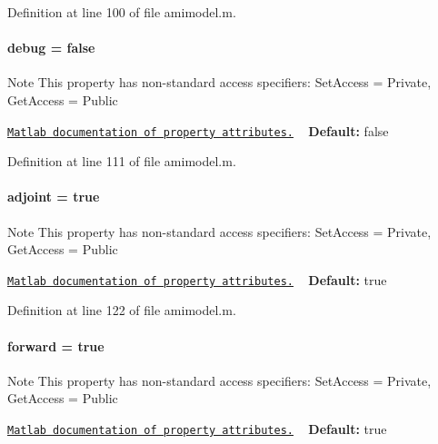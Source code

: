 Definition at line 100 of file amimodel.\+m.

\hypertarget{classamimodel_a0514aabed091ee5e2f35766eb01eced6}{}
\paragraph[{debug}]{\setlength{\rightskip}{0pt plus 5cm}debug = false}\label{classamimodel_a0514aabed091ee5e2f35766eb01eced6}
\begin{DoxyNote}{Note}
This property has non-\/standard access specifiers\+: {\ttfamily Set\+Access = Private, Get\+Access = Public} 

\href{http://www.mathworks.com/help/matlab/matlab_oop/property-attributes.html}{\tt Matlab documentation of property attributes.} ~\newline
{\bfseries Default\+:} false 
\end{DoxyNote}


Definition at line 111 of file amimodel.\+m.

\hypertarget{classamimodel_ab6d500b41cf50693452415caca31d32e}{}
\paragraph[{adjoint}]{\setlength{\rightskip}{0pt plus 5cm}adjoint = true}\label{classamimodel_ab6d500b41cf50693452415caca31d32e}
\begin{DoxyNote}{Note}
This property has non-\/standard access specifiers\+: {\ttfamily Set\+Access = Private, Get\+Access = Public} 

\href{http://www.mathworks.com/help/matlab/matlab_oop/property-attributes.html}{\tt Matlab documentation of property attributes.} ~\newline
{\bfseries Default\+:} true 
\end{DoxyNote}


Definition at line 122 of file amimodel.\+m.

\hypertarget{classamimodel_a81e42e48c9c72814166c8f7cd414ce24}{}
\paragraph[{forward}]{\setlength{\rightskip}{0pt plus 5cm}forward = true}\label{classamimodel_a81e42e48c9c72814166c8f7cd414ce24}
\begin{DoxyNote}{Note}
This property has non-\/standard access specifiers\+: {\ttfamily Set\+Access = Private, Get\+Access = Public} 

\href{http://www.mathworks.com/help/matlab/matlab_oop/property-attributes.html}{\tt Matlab documentation of property attributes.} ~\newline
{\bfseries Default\+:} true 
\end{DoxyNote}


